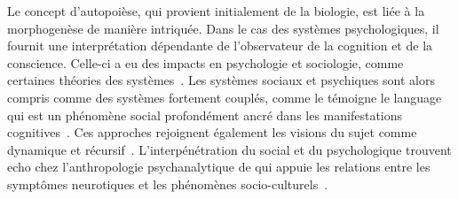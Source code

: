 {%
}{
Le concept d'autopoièse, qui provient initialement de la biologie, est liée à la morphogenèse de manière intriquée. Dans le cas des systèmes psychologiques, il fournit une interprétation dépendante de l'observateur de la cognition et de la conscience. Celle-ci a eu des impacts en psychologie et sociologie, comme certaines théories des systèmes~\cite{gershenson2015requisite}. Les systèmes sociaux et psychiques sont alors compris comme des systèmes fortement couplés, comme le témoigne le language qui est un phénomène social profondément ancré dans les manifestations cognitives~\cite{seidl_luhmanns_2004}. Ces approches rejoignent également les visions du sujet comme dynamique et récursif~\cite{pichon_riviere_processus_2004}. L'interpénétration du social et du psychologique trouvent echo chez l'anthropologie psychanalytique de  qui appuie les relations entre les symptômes neurotiques et les phénomènes socio-culturels~\cite{freud_totem_1989}.
}




